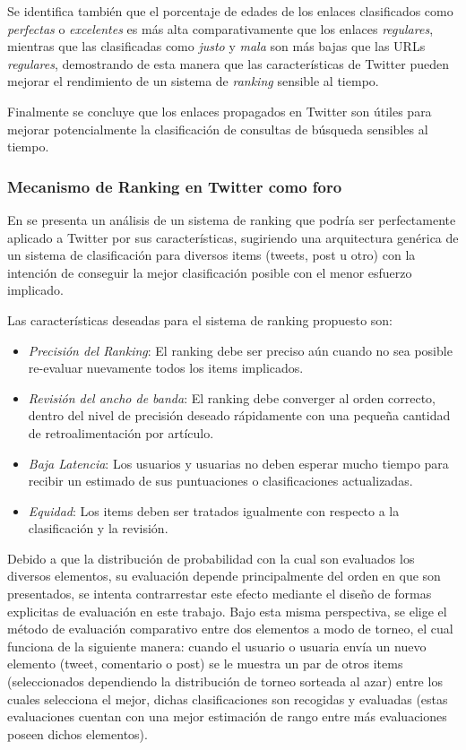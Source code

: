	Se identifica también que el porcentaje de edades de los enlaces clasificados como \emph{perfectas} o \emph{excelentes} es más alta comparativamente que los enlaces \emph{regulares}, mientras que las clasificadas como \emph{justo} y \emph{mala} son más bajas que las URLs \emph{regulares}, demostrando de esta manera que las características de Twitter pueden mejorar el rendimiento de un sistema de \emph{ranking} sensible al tiempo.  
	
	Finalmente se concluye que los enlaces propagados en Twitter son útiles para mejorar potencialmente la clasificación de consultas de búsqueda sensibles al tiempo.
	
\subsubsection{Mecanismo de Ranking en Twitter como foro}

	 En \cite{DasSarma:2010:RMT:1718487.1718491} se presenta un análisis de un sistema de ranking que podría ser perfectamente aplicado a Twitter por sus características, sugiriendo una arquitectura genérica de un sistema de clasificación para diversos items (tweets, post u otro) con la intención de conseguir la mejor clasificación posible con el menor esfuerzo implicado.

Las características deseadas para el sistema de ranking propuesto son:

	\begin{itemize}
		\item \emph{Precisión del Ranking}: El ranking debe ser preciso aún cuando no sea posible re-evaluar nuevamente todos los items implicados.
		
		\item \emph{Revisión del ancho de banda}: El ranking debe converger al orden correcto, dentro del nivel de precisión deseado rápidamente con una pequeña cantidad de retroalimentación por artículo.
		
		\item \emph{Baja Latencia}: Los usuarios y usuarias no deben esperar mucho tiempo para recibir un estimado de sus puntuaciones o clasificaciones actualizadas.
		
		\item \emph{Equidad}: Los items deben ser tratados igualmente con respecto a la clasificación y la revisión.
	\end{itemize}

	Debido a que la distribución de probabilidad con la cual son evaluados los diversos elementos, su evaluación depende principalmente del orden en que son presentados, se intenta contrarrestar este efecto mediante el diseño de formas explicitas de evaluación en este trabajo. Bajo esta misma perspectiva, se elige
	el método de evaluación comparativo entre dos elementos a modo de torneo, el cual funciona de la siguiente manera: cuando el usuario o usuaria envía un nuevo elemento (tweet, comentario o post) se le muestra un par de otros items (seleccionados dependiendo la distribución de torneo sorteada al azar) entre los cuales selecciona el mejor, dichas clasificaciones son recogidas y evaluadas (estas evaluaciones cuentan con una mejor estimación de rango entre más evaluaciones poseen dichos elementos).
	
